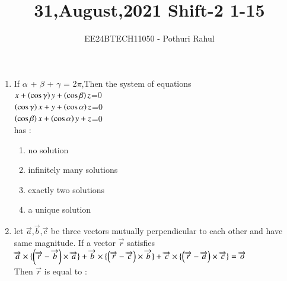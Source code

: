 \documentclass[journal]{IEEEtran}
\begin{document}

\vspace{3cm}
\title{31,August,2021 Shift-2 1-15}
\author{EE24BTECH11050 - Pothuri Rahul}
{\let\newpage\relax\maketitle}
\renewcommand{\thefigure}{\theenumi}
\renewcommand{\thetable}{\theenumi}
\setlength{\intextsep}{10pt} %
\renewcommand{\thetable}{\theenumi}
\begin{enumerate}[start=1]
\item %
If $\alpha$ + $\beta$ + $\gamma$ = 2$\pi$,Then the system of equations \\
$x+\left(\cos{\gamma}\right)y+\left(\cos{\beta}\right)z$=0 \\
$\left(\cos{\gamma}\right)x+y+\left(\cos{\alpha}\right)z$=0 \\
$\left(\cos{\beta}\right)x+\left(\cos{\alpha}\right)y+z$=0 \\
has :
\begin{enumerate}
\item no solution
\item infinitely many solutions
\item exactly two solutions
\item a unique solution
\end{enumerate}
\item %
let $\overrightarrow{a}$,$\overrightarrow{b}$,$\overrightarrow{c}$ be three vectors mutually perpendicular to each other and have same magnitude. If a vector $\overrightarrow{r}$ satisfies \\
$\overrightarrow{a} \times \{\left(\overrightarrow{r}-\overrightarrow{b}\right)\times\overrightarrow{a}\}+\overrightarrow{b} \times \{\left(\overrightarrow{r}-\overrightarrow{c}\right)\times\overrightarrow{b}\}+\overrightarrow{c} \times \{\left(\overrightarrow{r}-\overrightarrow{a}\right)\times\overrightarrow{c}\} = \overrightarrow{o}$ \\
Then $\overrightarrow{r}$ is equal to : \\
\begin{enumerate}
\end{enumerate}
\end{enumerate}
\end{document}
